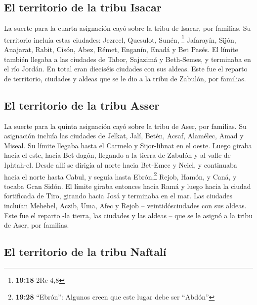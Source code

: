\hypertarget{el-territorio-de-la-tribu-isacar}{%
\subsection{El territorio de la tribu
Isacar}\label{el-territorio-de-la-tribu-isacar}}

 La suerte para la cuarta asignación cayó sobre la tribu
de Isacar, por familias.  Su territorio incluía estas
ciudades: Jezreel, Quesulot, Sunén, \footnote{\textbf{19:18} 2Re 4,8}
 Jafarayín, Sijón, Anajarat,  Rabit,
Cisón, Abez,  Rémet, Enganín, Enadá y Bet Pasés.
 El límite también llegaba a las ciudades de Tabor,
Sajazimá y Beth-Semes, y terminaba en el río Jordán. En total eran
dieciséis ciudades con sus aldeas.  Este fue el reparto
de territorio, ciudades y aldeas que se le dio a la tribu de Zabulón,
por familias.

\hypertarget{el-territorio-de-la-tribu-asser}{%
\subsection{El territorio de la tribu
Asser}\label{el-territorio-de-la-tribu-asser}}

 La suerte para la quinta asignación cayó sobre la tribu
de Aser, por familias.  Su asignación incluía las
ciudades de Jelkat, Jalí, Betén, Acsaf,  Alamélec, Amad y
Miseal. Su límite llegaba hasta el Carmelo y Sijor-libnat en el oeste.
 Luego giraba hacia el este, hacia Bet-dagón, llegando a
la tierra de Zabulón y al valle de Iphtah-el. Desde allí se dirigía al
norte hacia Bet-Emec y Neiel, y continuaba hacia el norte hasta Cabul, y
seguía hasta  Ebrón,\footnote{\textbf{19:28} ``Ebrón'':
  Algunos creen que este lugar debe ser ``Abdón''} Rejob, Hamón, y Caná,
y tocaba Gran Sidón.  El límite giraba entonces hacia
Ramá y luego hacia la ciudad fortificada de Tiro, girando hacia Josá y
terminaba en el mar. Las ciudades incluían Mehebel, Aczib,
 Uma, Afec y Rejob -- veintidósciudades con sus aldeas.
 Este fue el reparto -la tierra, las ciudades y las
aldeas -- que se le asignó a la tribu de Aser, por familias.

\hypertarget{el-territorio-de-la-tribu-naftaluxed}{%
\subsection{El territorio de la tribu
Naftalí}\label{el-territorio-de-la-tribu-naftaluxed}}

